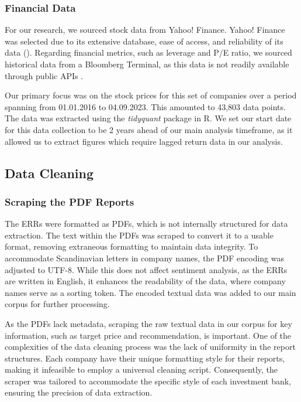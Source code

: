 \subsubsection{Financial Data}
For our research, we sourced stock data from Yahoo! Finance. %
Yahoo! Finance was selected due to its extensive database, ease of access, and reliability of its data (\cite{YahooFinance}). Regarding financial metrics, such as leverage and P/E ratio, we sourced historical data from a Bloomberg Terminal, as this data is not readily available through public APIs \parencite{bloomberg2023}. 

Our primary focus was on the stock prices for this set of companies over a period spanning from 01.01.2016 to 04.09.2023. This amounted to 43,803 data points. The data was extracted using the \textit{tidyquant} package in R. We set our start date for this data collection to be 2 years ahead of our main analysis timeframe, as it allowed us to extract figures which require lagged return data in our analysis.

\subsection{Data Cleaning}

\subsubsection{Scraping the PDF Reports}

The ERRs were formatted as PDFs, which is not internally structured for data extraction. The text within the PDFs was scraped to convert it to a usable format, removing extraneous formatting to maintain data integrity. To accommodate Scandinavian letters in company names, the PDF encoding was adjusted to UTF-8. While this does not affect sentiment analysis, as the ERRs are written in English, it enhances the readability of the data, where company names serve as a sorting token. The encoded textual data was added to our main corpus for further processing.

As the PDFs lack metadata, scraping the raw textual data in our corpus for key information, such as target price and recommendation, is important. One of the complexities of the data cleaning process was the lack of uniformity in the report structures. Each company have their unique formatting style for their reports, making it infeasible to employ a universal cleaning script. Consequently, the scraper was tailored to accommodate the specific style of each investment bank, ensuring the precision of data extraction.

